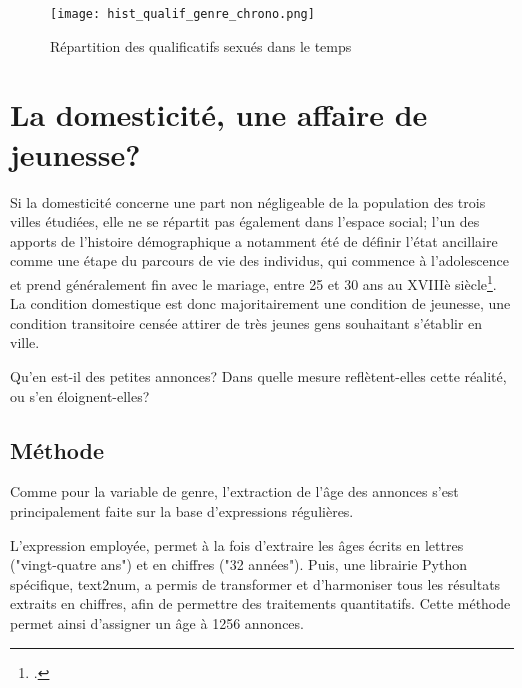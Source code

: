 \begin{figure}[t]
	\centering
	\texttt{[image: hist\_qualif\_genre\_chrono.png]}
	\caption{Répartition des qualificatifs sexués dans le temps}
\end{figure}



\chapter{La domesticité, une affaire de jeunesse?}

Si la domesticité concerne une part non négligeable de la population des trois villes étudiées, elle ne se répartit pas également dans l'espace social; l'un des apports de l'histoire démographique a notamment été de définir l'état ancillaire comme une étape du parcours de vie des individus, qui commence à l'adolescence et prend généralement fin avec le mariage, entre 25 et 30 ans au XVIIIè siècle\footcites{chamouxDomesticiteParcoursVie2009}. La condition domestique est donc majoritairement une condition de jeunesse, une condition transitoire censée attirer de très jeunes gens souhaitant s'établir en ville.

Qu'en est-il des petites annonces? Dans quelle mesure reflètent-elles cette réalité, ou s'en éloignent-elles? 



\section{Méthode}

Comme pour la variable de genre, l'extraction de l'âge des annonces s'est principalement faite sur la base d'expressions régulières. 

L'expression employée,  permet à la fois d'extraire les âges écrits en lettres ("vingt-quatre ans") et en chiffres ("32 années"). Puis, une librairie Python spécifique, text2num, a permis de transformer et d'harmoniser tous les résultats extraits en chiffres, afin de permettre des traitements quantitatifs. Cette méthode permet ainsi d'assigner un âge à 1256 annonces. 

